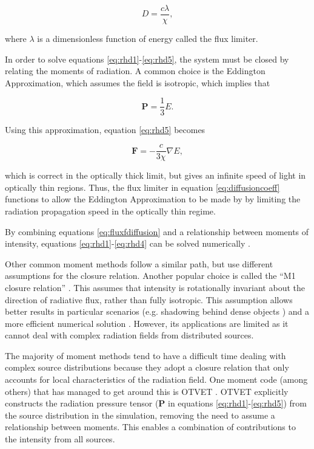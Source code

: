 \begin{equation}
\label{eq:diffusioncoeff}
D = \frac{c\lambda}{\chi},
\end{equation}

\noindent
where $\lambda$ is a dimensionless function of energy called the flux limiter.

In order to solve equations \ref{eq:rhd1}-\ref{eq:rhd5}, the system must be closed by relating the moments of radiation. A common choice is the Eddington Approximation, which assumes the field is isotropic, which implies that

\begin{equation}
\label{eq:eddingtonapprox}
\mathbf{P} = \frac{1}{3}E.
\end{equation}

Using this approximation, equation \ref{eq:rhd5} becomes

\begin{equation}
\label{eq:eddingtonrhd}
\mathbf{F} = -\frac{c}{3\chi}\nabla E,
\end{equation}

\noindent
which is correct in the optically thick limit, but gives an infinite speed of light in optically thin regions. Thus, the flux limiter in equation \ref{eq:diffusioncoeff} functions to allow the Eddington Approximation to be made by by limiting the radiation propagation speed in the optically thin regime.

By combining equations \ref{eq:fluxfdiffusion} and a relationship between moments of intensity, equations \ref{eq:rhd1}-\ref{eq:rhd4} can be solved numerically \citep{turnerStone01}.

Other common moment methods follow a similar path, but use different assumptions for the closure relation. Another popular choice is called the ``M1 closure relation'' \citep{rosdahlTeyssier15, skinnerOstriker13,aubertTeyssier08,auditGonzalez06,levermore84}. This assumes that intensity is rotationally invariant about the direction of radiative flux, rather than fully isotropic. This assumption allows better results in particular scenarios (e.g. shadowing behind dense objects \citep{skinnerOstriker13}) and a more efficient numerical solution \citep{gonzalezEt07,aubertTeyssier08}. However, its applications are limited as it cannot deal with complex radiation fields from distributed sources.

The majority of moment methods tend to have a difficult time dealing with complex source distributions because they adopt a closure relation that only accounts for local characteristics of the radiation field. One moment code (among others) that has managed to get around this is OTVET \citep{gnedinAbel01}. OTVET explicitly constructs the radiation pressure tensor ($\mathbf{P}$ in equations \ref{eq:rhd1}-\ref{eq:rhd5}) from the source distribution in the simulation, removing the need to assume a relationship between moments. This enables a combination of contributions to the intensity from all sources.

